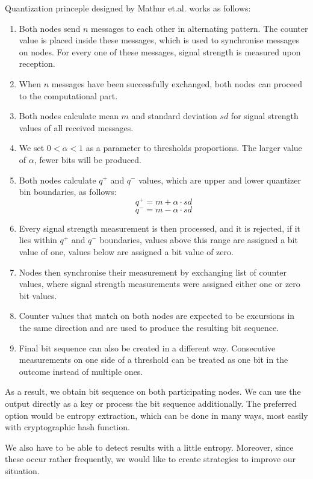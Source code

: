 \documentclass[
  print, %
  Table,   %
  nolof,     %
  nolot,     %
           oneside
]{fithesis3}
\begin{document}
    Quantization princeple designed by Mathur et.al. \cite{Mathur2008Rssi}
     works as follows:

    \begin{enumerate}
      \item Both nodes send $n$ messages to each other in alternating pattern. The counter value is placed inside these messages, which is used to synchronise messages on nodes. For every one of these messages, signal strength is measured upon reception.
      \item When $n$ messages have been successfully exchanged, both nodes can proceed to the computational part.
      \item Both nodes calculate mean $m$ and standard deviation $sd$ for signal strength values of all received messages.
      \item We set $ 0 < \alpha < 1$ as a parameter to thresholds proportions. The larger value of $\alpha$, fewer bits will be produced.
      \item Both nodes calculate $q^+$ and $q^-$ values, which are upper and lower quantizer bin boundaries, as follows:
      $$q^+ = m + \alpha \cdot sd$$
      $$q^- = m - \alpha \cdot sd$$
      \item Every signal strength measurement is then processed, and it is rejected, if it lies within $q^+$ and $q^-$ boundaries, values above this range are assigned a bit value of one, values below are assigned a bit value of zero.
      \item Nodes then synchronise their measurement by exchanging list of counter values, where signal strength measurements were assigned either one or zero bit values.
      \item Counter values that match on both nodes are expected to be excursions in the same direction and are used to produce the resulting bit sequence.
      \item Final bit sequence can also be created in a different way. Consecutive measurements on one side of a threshold can be treated as one bit in the outcome instead of multiple ones.
    \end{enumerate}

  As a result, we obtain bit sequence on both participating nodes. We can use the output directly as a key or process the bit sequence additionally. The preferred option would be entropy extraction, which can be done in many ways, most easily with cryptographic hash function.

  We also have to be able to detect results with a little entropy. Moreover, since these occur rather frequently, we would like to create strategies to improve our situation.
\end{document}
